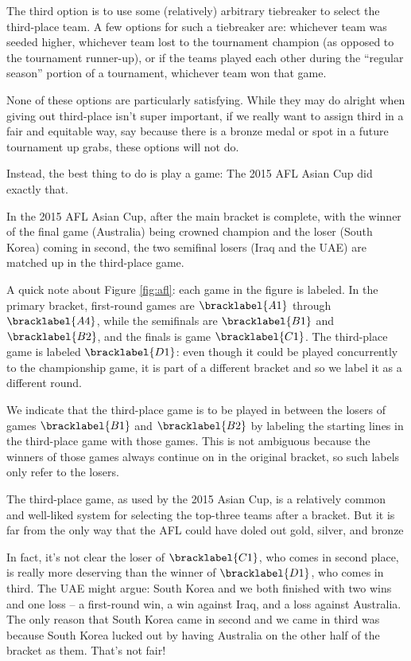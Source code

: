 {    The third option is to use some (relatively) arbitrary tiebreaker to select the third-place team. A few options for such a tiebreaker are: whichever team was seeded higher, whichever team lost to the tournament champion (as opposed to the tournament runner-up), or if the teams played each other during the ``regular season'' portion of a tournament, whichever team won that game.

    None of these options are particularly satisfying. While they may do alright when giving out third-place isn't super important, if we really want to assign third in a fair and equitable way, say because there is a bronze medal or spot in a future tournament up grabs, these options will not do.

    Instead, the best thing to do is play a game: The 2015 AFL Asian Cup did exactly that.


    In the 2015 AFL Asian Cup, after the main bracket is complete, with the winner of the final game (Australia) being crowned champion and the loser (South Korea) coming in second, the two semifinal losers (Iraq and the UAE) are matched up in the third-place game.

    A quick note about Figure \ref{fig:afl}: each game in the figure is labeled. In the primary bracket, first-round games are $\bracklabel{A1}$ through $\bracklabel{A4}$, while the semifinals are $\bracklabel{B1}$ and $\bracklabel{B2}$, and the finals is game $\bracklabel{C1}$. The third-place game is labeled $\bracklabel{D1}$: even though it could be played concurrently to the championship game, it is part of a different bracket and so we label it as a different round. %

    We indicate that the third-place game is to be played in between the losers of games $\bracklabel{B1}$ and $\bracklabel{B2}$ by labeling the starting lines in the third-place game with those games. This is not ambiguous because the winners of those games always continue on in the original bracket, so such labels only refer to the losers.

    The third-place game, as used by the 2015 Asian Cup, is a relatively common and well-liked system for selecting the top-three teams after a bracket. But it is far from the only way that the AFL could have doled out gold, silver, and bronze
    
    In fact, it's not clear the loser of $\bracklabel{C1}$, who comes in second place, is really more deserving than the winner of $\bracklabel{D1}$, who comes in third. The UAE might argue: South Korea and we both finished with two wins and one loss -- a first-round win, a win against Iraq, and a loss against Australia. The only reason that South Korea came in second and we came in third was because South Korea lucked out by having Australia on the other half of the bracket as them. That's not fair!

}
